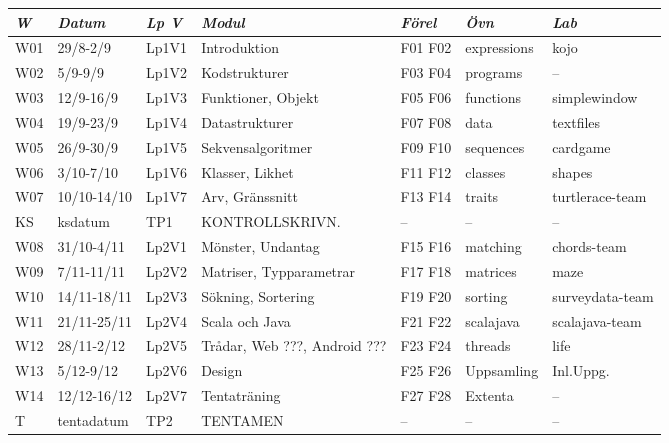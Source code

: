 \begin{tabular}{l|l|l|l|l|l|l}
\textit{W} & \textit{Datum} & \textit{Lp V} & \textit{Modul} & \textit{Förel} & \textit{Övn} & \textit{Lab} \\ \hline \hline
W01 & 29/8-2/9    & Lp1V1 & Introduktion                 & F01 F02 & expressions & kojo            \\
W02 & 5/9-9/9     & Lp1V2 & Kodstrukturer                & F03 F04 & programs    & --              \\
W03 & 12/9-16/9   & Lp1V3 & Funktioner, Objekt           & F05 F06 & functions   & simplewindow    \\
W04 & 19/9-23/9   & Lp1V4 & Datastrukturer               & F07 F08 & data        & textfiles       \\
W05 & 26/9-30/9   & Lp1V5 & Sekvensalgoritmer            & F09 F10 & sequences   & cardgame        \\
W06 & 3/10-7/10   & Lp1V6 & Klasser, Likhet              & F11 F12 & classes     & shapes          \\
W07 & 10/10-14/10 & Lp1V7 & Arv, Gränssnitt              & F13 F14 & traits      & turtlerace-team \\
KS  & ksdatum     & TP1   & KONTROLLSKRIVN.              & --      & --          & --              \\
W08 & 31/10-4/11  & Lp2V1 & Mönster, Undantag            & F15 F16 & matching    & chords-team     \\
W09 & 7/11-11/11  & Lp2V2 & Matriser, Typparametrar      & F17 F18 & matrices    & maze            \\
W10 & 14/11-18/11 & Lp2V3 & Sökning, Sortering           & F19 F20 & sorting     & surveydata-team \\
W11 & 21/11-25/11 & Lp2V4 & Scala och Java               & F21 F22 & scalajava   & scalajava-team  \\
W12 & 28/11-2/12  & Lp2V5 & Trådar, Web ???, Android ??? & F23 F24 & threads     & life            \\
W13 & 5/12-9/12   & Lp2V6 & Design                       & F25 F26 & Uppsamling  & Inl.Uppg.       \\
W14 & 12/12-16/12 & Lp2V7 & Tentaträning                 & F27 F28 & Extenta     & --              \\
T   & tentadatum  & TP2   & TENTAMEN                     & --      & --          & --              \\
\end{tabular}
